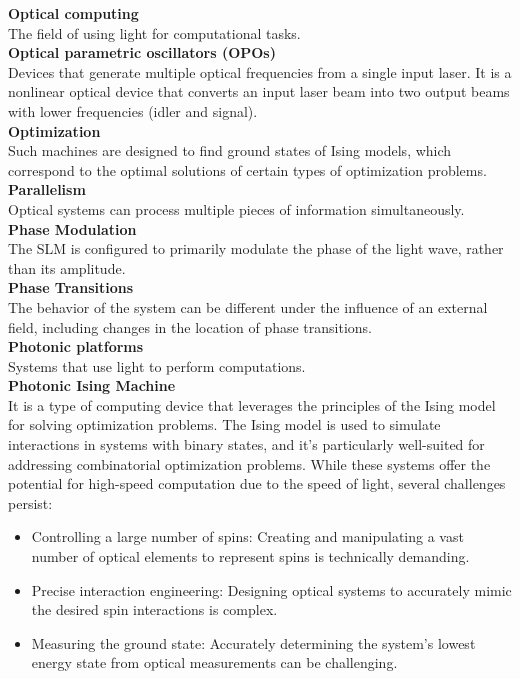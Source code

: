\textbf{Optical computing} \\
The field of using light for computational tasks. \\

\textbf{Optical parametric oscillators (OPOs)} \\
Devices that generate multiple optical frequencies from a single input laser. It is a nonlinear optical device that converts an input laser beam into two output beams with lower frequencies (idler and signal).
\\

\textbf{Optimization} \\
Such machines are designed to find ground states of Ising models, which correspond to the optimal solutions of certain types of optimization problems. \\

\textbf{Parallelism}\\
Optical systems can process multiple pieces of information simultaneously.\\

\textbf{Phase Modulation}\\
The SLM is configured to primarily modulate the phase of the light wave, rather than its amplitude.\\

\textbf{Phase Transitions} \\
The behavior of the system can be different under the influence of an external field, including changes in the location of phase transitions. \\

\textbf{Photonic platforms}\\
Systems that use light to perform computations. \\

\textbf{Photonic Ising Machine} \\
It is a type of computing device that leverages the principles of the Ising model for solving optimization problems. The Ising model is used to simulate interactions in systems with binary states, and it's particularly well-suited for addressing combinatorial optimization problems. While these systems offer the potential for high-speed computation due to the speed of light, several challenges persist:

\begin{itemize}
\item Controlling a large number of spins: Creating and manipulating a vast number of optical elements to represent spins is technically demanding.
\item Precise interaction engineering: Designing optical systems to accurately mimic the desired spin interactions is complex.
\item Measuring the ground state: Accurately determining the system's lowest energy state from optical measurements can be challenging.
\end{itemize}

